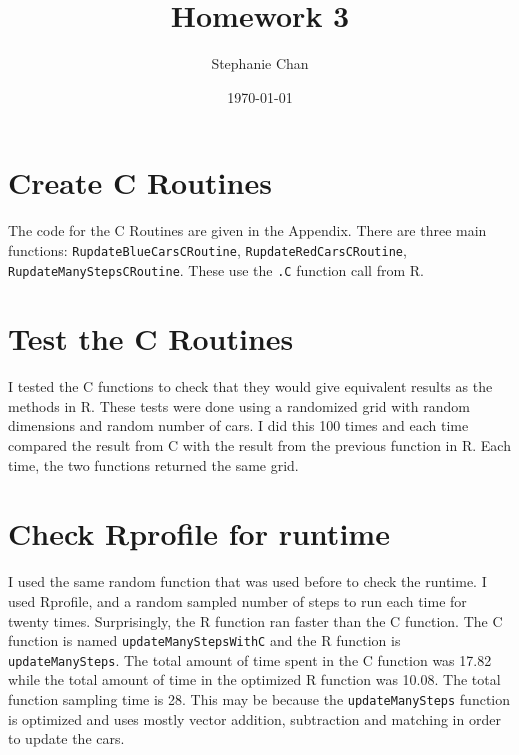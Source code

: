 \documentclass[11pt]{article}
\title{Homework 3}
\author{Stephanie Chan}
\date{\today}
\begin{document}
\maketitle

\setcounter{tocdepth}{3}
\tableofcontents
\vspace*{1cm}


\section{Create C Routines}
\label{sec-1}

The code for the C Routines are given in the Appendix.  There are
three main functions: \verb~RupdateBlueCarsCRoutine~, \verb~RupdateRedCarsCRoutine~,
\verb~RupdateManyStepsCRoutine~.  These use the \verb~.C~ function call from R.
\section{Test the C Routines}
\label{sec-2}

I tested the C functions to check that they would give equivalent
results as the methods in R.  These tests were done using a randomized
grid with random dimensions and random number of cars.  I did this 100
times and each time compared the result from C with the result from
the previous function in R.  Each time, the two functions returned the
same grid.
\section{Check Rprofile for runtime}
\label{sec-3}


I used the same random function that was used before to check the
runtime.  I used Rprofile, and a random sampled number of steps to run
each time for twenty times.  Surprisingly, the R function ran faster
than the C function.  The C function is named \verb~updateManyStepsWithC~
and the R function is \verb~updateManySteps~.  The total amount of time
spent in the C function was 17.82 while the total amount of time in
the optimized R function was 10.08.  The total function sampling time
is 28.  This may be because the \verb~updateManySteps~ function is
optimized and uses mostly vector addition, subtraction and matching in
order to update the cars.
\end{document}
